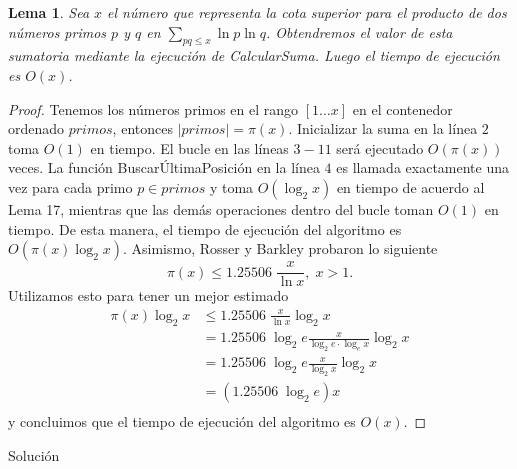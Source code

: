 \documentclass{article}
\newtheorem{lemma}[theorem]{Lema}
\theoremstyle{definition}
\theoremstyle{remark}
\begin{document}
\begin{lemma}
Sea $x$ el n\'umero que representa la cota superior para el producto de dos n\'umeros primos
$p$ y $q$ en $\sum_{pq \leq x} \ln p \ln q$.
Obtendremos el valor de esta sumatoria mediante la ejecuci\'on de CalcularSuma.
Luego el tiempo de ejecuci\'on es $O(x)$.
\end{lemma}

\begin{proof}
Tenemos los n\'umeros primos en el rango $[1 \dots x]$ en el contenedor ordenado $primos$,
entonces $|primos| = \pi(x)$.
Inicializar la suma en la l\'inea $2$ toma $O(1)$ en tiempo.
El bucle en las l\'ineas $3-11$ ser\'a ejecutado $O(\pi(x))$ veces.
La funci\'on Buscar\'UltimaPosici\'on en la l\'inea $4$ es llamada exactamente una vez para cada primo $p \in primos$ y
toma $O(\log_2 x)$ en tiempo de acuerdo al Lema 17, mientras que las dem\'as operaciones dentro del bucle
toman $O(1)$ en tiempo.
De esta manera, el tiempo de ejecuci\'on del algoritmo es $O(\pi(x)\log_2 x)$.
Asimismo, Rosser y Barkley probaron lo siguiente \cite[Teorema 2, Corolario 1]{Chebyshev}
$$\pi(x) \leq 1.25506\;\frac{x}{\ln x},\;x > 1.$$
Utilizamos esto para tener un mejor estimado
\begin{align*}
    \pi(x)\log_2 x &\leq 1.25506\;\frac{x}{\ln x} \log_2 x\\
    &= 1.25506\;\log_2 e \frac{x}{\log_2 e \cdot \log_e x} \log_2 x\\
    &= 1.25506\;\log_2 e \frac{x}{\log_2 x} \log_2 x\\
    &= (1.25506\;\log_2 e) x\\
\end{align*}
y concluimos que el tiempo de ejecuci\'on del algoritmo es $O(x)$.
\end{proof}

\begin{algorithm}[H]
\SetAlgoLined
\DontPrintSemicolon
{}
\caption{Soluci\'on}
\end{algorithm}
\end{document}

